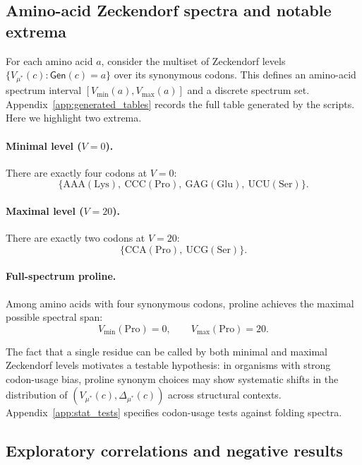 \subsection{Amino-acid Zeckendorf spectra and notable extrema}
\label{sec:aa_spectra}

For each amino acid $a$, consider the multiset of Zeckendorf levels $\{V_{\mu^\ast}(c): \mathsf{Gen}(c)=a\}$ over its synonymous codons.
This defines an amino-acid spectrum interval $[V_{\min}(a),V_{\max}(a)]$ and a discrete spectrum set.
Appendix~\ref{app:generated_tables} records the full table generated by the scripts.
Here we highlight two extrema.

\paragraph{Minimal level ($V=0$).}
There are exactly four codons at $V=0$:
\[
\{\mathrm{AAA}(\mathrm{Lys}),\ \mathrm{CCC}(\mathrm{Pro}),\ \mathrm{GAG}(\mathrm{Glu}),\ \mathrm{UCU}(\mathrm{Ser})\}.
\]

\paragraph{Maximal level ($V=20$).}
There are exactly two codons at $V=20$:
\[
\{\mathrm{CCA}(\mathrm{Pro}),\ \mathrm{UCG}(\mathrm{Ser})\}.
\]

\paragraph{Full-spectrum proline.}
Among amino acids with four synonymous codons, proline achieves the maximal possible spectral span:
\[
V_{\min}(\mathrm{Pro})=0,\qquad V_{\max}(\mathrm{Pro})=20.
\]
\begin{remark}
The fact that a single residue can be called by both minimal and maximal Zeckendorf levels motivates a testable hypothesis: in organisms with strong codon-usage bias, proline synonym choices may show systematic shifts in the distribution of $(V_{\mu^\ast}(c),\Delta_{\mu^\ast}(c))$ across structural contexts.
Appendix~\ref{app:stat_tests} specifies codon-usage tests against folding spectra.
\end{remark}

\subsection{Exploratory correlations and negative results}
\label{sec:hydrophobicity}

